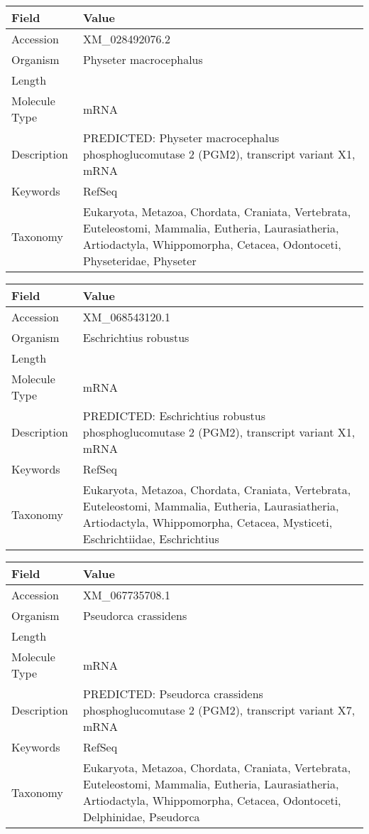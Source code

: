 \documentclass[10pt]{article}
\begin{document}
{\footnotesize
\begin{longtable}{>{\raggedright\arraybackslash}p{4.5cm} >{\raggedright\arraybackslash}p{11.5cm}}
\textbf{Field} & \textbf{Value} \\
\hline
Accession & XM\_028492076.2 \\
Organism & Physeter macrocephalus \\
Length & 2077 \\
Molecule Type & mRNA \\
Description & PREDICTED: Physeter macrocephalus phosphoglucomutase 2 (PGM2), transcript variant X1, mRNA \\
Keywords & RefSeq \\
Taxonomy & Eukaryota, Metazoa, Chordata, Craniata, Vertebrata, Euteleostomi, Mammalia, Eutheria, Laurasiatheria, Artiodactyla, Whippomorpha, Cetacea, Odontoceti, Physeteridae, Physeter \\
\end{longtable}
}

{\footnotesize
\begin{longtable}{>{\raggedright\arraybackslash}p{4.5cm} >{\raggedright\arraybackslash}p{11.5cm}}
\textbf{Field} & \textbf{Value} \\
\hline
Accession & XM\_068543120.1 \\
Organism & Eschrichtius robustus \\
Length & 4200 \\
Molecule Type & mRNA \\
Description & PREDICTED: Eschrichtius robustus phosphoglucomutase 2 (PGM2), transcript variant X1, mRNA \\
Keywords & RefSeq \\
Taxonomy & Eukaryota, Metazoa, Chordata, Craniata, Vertebrata, Euteleostomi, Mammalia, Eutheria, Laurasiatheria, Artiodactyla, Whippomorpha, Cetacea, Mysticeti, Eschrichtiidae, Eschrichtius \\
\end{longtable}
}

{\footnotesize
\begin{longtable}{>{\raggedright\arraybackslash}p{4.5cm} >{\raggedright\arraybackslash}p{11.5cm}}
\textbf{Field} & \textbf{Value} \\
\hline
Accession & XM\_067735708.1 \\
Organism & Pseudorca crassidens \\
Length & 12448 \\
Molecule Type & mRNA \\
Description & PREDICTED: Pseudorca crassidens phosphoglucomutase 2 (PGM2), transcript variant X7, mRNA \\
Keywords & RefSeq \\
Taxonomy & Eukaryota, Metazoa, Chordata, Craniata, Vertebrata, Euteleostomi, Mammalia, Eutheria, Laurasiatheria, Artiodactyla, Whippomorpha, Cetacea, Odontoceti, Delphinidae, Pseudorca \\
\end{longtable}
}
\end{document}
